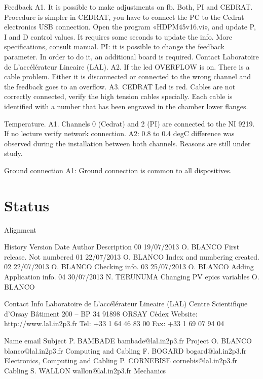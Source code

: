 \documentclass[a4paper,11pt]{book}
\begin{document}
Feedback
A1. It is possible to make adjustments on fb. Both, PI and CEDRAT. 
Procedure is simpler in CEDRAT, you have to connect the PC to the Cedrat electronics USB connection. Open the program «HDPM45v16.vi», and update P, I and D control values. It requires some seconds to update the info. More specifications, consult manual.
PI: it is possible to change the feedback parameter. In order to do it, an additional board is required. Contact Laboratoire de L'accélérateur Lineaire (LAL).
A2. If the led OVERFLOW is on. There is a cable problem. Either it is disconnected or connected to the wrong channel and the feedback goes to an overflow.
A3. CEDRAT Led is red. Cables are not correctly connected, verify the high tension cables specially. Each cable is identified with a number that has been engraved in the chamber lower flanges.

Temperature.
A1. Channels 0 (Cedrat) and 2 (PI) are connected to the NI 9219. If no lecture verify network connection.
A2: 0.8 to 0.4 degC difference was observed during the installation between both channels. Reasons are still under study.

Ground connection
A1: Ground connection is common to all dispositives. 


\section{Status}
Alignment

History
Version	Date			Author		Description
00		19/07/2013	O. BLANCO		First release. Not numbered
01		22/07/2013	O. BLANCO		Index and numbering created.
02		22/07/2013	O. BLANCO		Checking info.
03		25/07/2013	O. BLANCO		Adding Application info.
04		30/07/2013	N. TERUNUMA	Changing PV epics variables
					O. BLANCO

Contact Info
Laboratoire de L'accélérateur Lineaire (LAL)
Centre Scientifique d'Orsay
Bâtiment 200 – BP 34
91898 ORSAY Cédex
Website: http://www.lal.in2p3.fr
Tel: 	+33 1 64 46 83 00
Fax: 	+33 1 69 07 94 04

Name			email				Subject
P. BAMBADE	bambade@lal.in2p3.fr	Project
O. BLANCO		blanco@lal.in2p3.fr	Computing and Cabling
F. BOGARD		bogard@lal.in2p3.fr	Electronics, Computing and Cabling
P. CORNEBISE	cornebis@lal.in2p3.fr	Cabling
S. WALLON		wallon@lal.in2p3.fr	Mechanics
\end{document}
